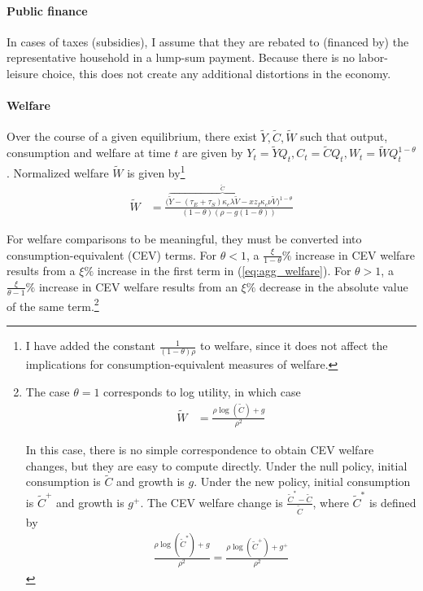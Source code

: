 \documentclass[11pt,english]{article}
\theoremstyle{remark}
\begin{document}
\paragraph{Public finance} 

In cases of taxes (subsidies), I assume that they are rebated to (financed by) the representative household in a lump-sum payment. Because there is no labor-leisure choice, this does not create any additional distortions in the economy. 

\paragraph{Welfare}

Over the course of a given equilibrium, there exist $\tilde{Y},\tilde{C},\tilde{W}$ such that output, consumption and welfare at time $t$ are given by $Y_t = \tilde{Y} Q_t, C_t = \tilde{C} Q_t, W_t = \tilde{W} Q_t^{1-\theta}$. Normalized welfare $\tilde{W}$ is given by\footnote{I have added the constant $\frac{1}{(1-\theta)\rho}$ to welfare, since it does not affect the implications for consumption-equivalent measures of welfare.}
\begin{align}
\tilde{W} &= \frac{\big(\overbrace{\tilde{Y} - (\tau_E + \tau_S) \kappa_{e} \lambda \tilde{V} - x z_I \kappa_c \nu \tilde{V}}^{\tilde{C}}\big)^{1-\theta}}{(1-\theta)(\rho - g(1-\theta))} \label{eq:agg_welfare}
\end{align}


For welfare comparisons to be meaningful, they must be converted into consumption-equivalent (CEV) terms. For $\theta < 1$, a $\frac{\xi}{1-\theta}\%$ increase in CEV welfare results from a $\xi\%$ increase in the first term in (\ref{eq:agg_welfare}). For $\theta > 1$, a $\frac{\xi}{\theta-1}\%$ increase in CEV welfare results from an $\xi\%$ decrease in the absolute value of the same term.\footnote{The case $\theta = 1$ corresponds to log utility, in which case
	\begin{align}
	\tilde{W} &= \frac{\rho \log(\tilde{C}) + g}{\rho^2} \label{eq:agg_welfare_log}
	\end{align}
	
	In this case, there is no simple correspondence to obtain CEV welfare changes, but they are easy to compute directly. Under the null policy, initial consumption is $\tilde{C}$ and growth is $g$. Under the new policy, initial consumption is $\tilde{C}^+$ and growth is $g^+$. The CEV welfare change is $\frac{\tilde{C}^* - \tilde{C}}{\tilde{C}}$, where $\tilde{C}^*$ is defined by 
	\begin{align}
	\frac{\rho\log(\tilde{C}^*) + g}{\rho^2} = \frac{\rho \log(\tilde{C}^+) + g^+}{\rho^2} \label{eq:agg_welfare_log_CEV}
	\end{align}}
\end{document}
